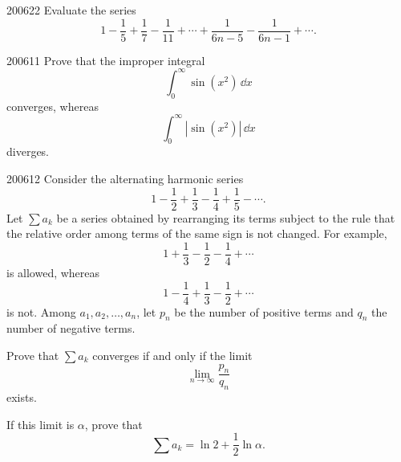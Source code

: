 \begin{problem}{2006}{2}{2}
Evaluate the series
\[
    1-\frac15+\frac17-\frac1{11}+\cdots
    +\frac1{6n-5}-\frac1{6n-1}+\cdots.
\]
\end{problem}

\begin{problem}{2006}{1}{1}
Prove that the improper integral
\[
    \int_0^{\infty}\sin(x^2)\, \dd x
\]
converges, whereas
\[
    \int_0^{\infty}|\sin(x^2)|\, \dd x
\]
diverges.
\end{problem}

\begin{problem}{2006}{1}{2}
Consider the alternating harmonic series
\[
    1-\frac12+\frac13-\frac14+\frac15-\cdots.
\]
Let $\sum a_k$ be a series obtained by rearranging its terms subject to the rule that the relative order among terms of the same sign is not changed. For example,
\[
    1+\frac13-\frac12-\frac14+\cdots
\]
is allowed, whereas
\[
    1-\frac14+\frac13-\frac12+\cdots
\]
is not. Among $a_1, a_2, \dots, a_n$, let $p_n$ be the number of positive terms and $q_n$ the number of negative terms.
\begin{problemsubparts}
    \item Prove that $\sum a_k$ converges if and only if the limit
    \[
        \lim_{n\to\infty}\frac{p_n}{q_n}
    \]
    exists.
    \item If this limit is $\alpha$, prove that
    \[
        \sum a_k=\ln2+\frac12\ln\alpha.
    \]
\end{problemsubparts}
\end{problem}
